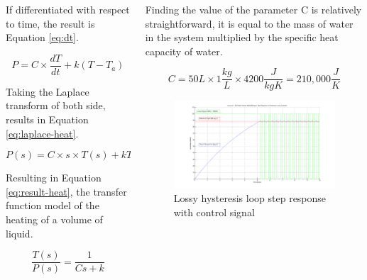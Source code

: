 \documentclass[final]{beamer}
\newlength{\onecolwid}
\newlength{\twocolwid}
\begin{document}
\begin{frame}[t]
\begin{columns}[t]
\begin{column}{\twocolwid}
\begin{columns}[t,totalwidth=\twocolwid]
\begin{column}{\onecolwid}
\noindent If differentiated with respect to time, the result is Equation \ref{eq:dt}.

\begin{equation}
P = C \times \frac{dT}{dt} + k(T - T_{a})
\label{eq:dt}
\end{equation}

Taking the Laplace transform of both side, results in Equation \ref{eq:laplace-heat}.

\begin{equation}
P(s) = C \times s \times T(s) + kT(s)
\label{eq:laplace-heat}
\end{equation}

\noindent Resulting in Equation \ref{eq:result-heat}, the transfer function model of the heating of a volume of liquid.

\begin{equation}
\frac{T(s)}{P(s)} = \frac{1}{Cs + k}
\label{eq:result-heat}
\end{equation}


\end{column} %

\begin{column}{\onecolwid} %
\noindent  Finding the value of the parameter C is relatively straightforward, it is equal to the mass of water in the system multiplied by the specific heat capacity of water.

\begin{equation}
C = 50L \times 1\frac{kg}{L} \times 4200\frac{J}{kgK} = 210,000\frac{J}{K}
\label{eq:value-heat}
\end{equation}

\begin{figure}
\includegraphics[width=\linewidth]{hysteresis-step-lossy.png}
\caption{Lossy hysteresis loop step response with control signal}
\end{figure}


\end{column}
\end{columns}
\end{column}
\end{columns}
\end{frame}
\end{document}
